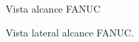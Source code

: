 \documentclass[a4paper,12pt]{article}
\begin{document}
\begin{figure}[H]
    \centering
    \begin{adjustbox}{scale = 0.8, max width=\columnwidth}
    \end{adjustbox}
    \caption{Vista alcance FANUC}
    \label{teach fanuc alcance vista}
\end{figure}

\begin{figure}[H]
    \centering
    \begin{adjustbox}{scale = 0.8, max width=\columnwidth}
    \end{adjustbox}
    \caption{Vista lateral alcance FANUC.}
    \label{teach fanuc alcance lateral}
\end{figure}
\end{document}
